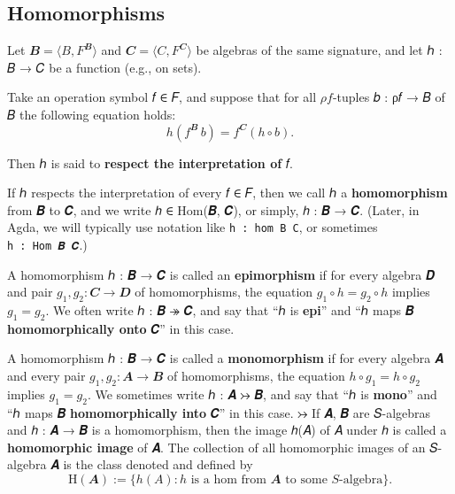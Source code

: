 \documentclass[sigplan,screen]{acmart}
\begin{document}


\subsection{Homomorphisms}\label{homomorphisms}
Let \(𝑩 = ⟨B, F^{𝑩}⟩\) and \(𝑪 = ⟨C, F^{𝑪}⟩\) be algebras of the same signature, and let ℎ : 𝐵 → 𝐶 be a function (e.g., on sets).

Take an operation symbol 𝑓 ∈ 𝐹, and suppose that for all \(ρ f\)-tuples 𝑏 : ρ𝑓 → 𝐵 of 𝐵 the following equation holds:
\[h (f^{𝑩} \, b) = f^{𝑪} (h ∘ b).\]

Then ℎ is said to \textbf{respect the interpretation of} 𝑓.

If ℎ respects the interpretation of every 𝑓 ∈ 𝐹, then we call ℎ a \textbf{homomorphism} from 𝑩 to 𝑪, and we write ℎ ∈ Hom(𝑩, 𝑪), or simply, ℎ : 𝑩 → 𝑪. (Later, in Agda, we will typically use notation like \texttt{h\ :\ hom\ B\ C}, or sometimes \texttt{h\ :\ Hom\ 𝑩\ 𝑪}.)

A homomorphism ℎ : 𝑩 → 𝑪 is called an \textbf{epimorphism} if for every algebra 𝑫 and pair \(g_1, g_2: 𝑪 → 𝑫\) of homomorphisms, the equation \(g_1 ∘ h = g_2 ∘ h\) implies \(g_1 = g_2\). We often write ℎ : 𝑩 ↠ 𝑪, and say that ``ℎ is \textbf{epi}'' and ``ℎ maps 𝑩 \textbf{homomorphically onto} 𝑪'' in this case.

A homomorphism ℎ : 𝑩 → 𝑪 is called a \textbf{monomorphism} if for every algebra 𝑨 and every pair \(g_1, g_2: 𝑨 → 𝑩\) of homomorphisms, the equation \(h ∘ g_1 = h ∘ g_2\) implies \(g_1 = g_2\). We sometimes write ℎ : 𝑨 ↣ 𝑩, and say that ``ℎ is \textbf{mono}'' and ``ℎ maps 𝑩 \textbf{homomorphically into} 𝑪'' in this case.
↣
If 𝑨, 𝑩 are 𝑆-algebras and ℎ : 𝑨 → 𝑩 is a homomorphism, then the image ℎ(𝐴) of 𝐴 under ℎ is called a \textbf{homomorphic image} of 𝑨. The collection of all homomorphic images of an 𝑆-algebra 𝑨 is the class denoted and defined by
\[\mathrm H(𝑨) := \{h(𝐴) : h \text{ is a hom from 𝑨 to some 𝑆-algebra}\}.\]
\end{document}

